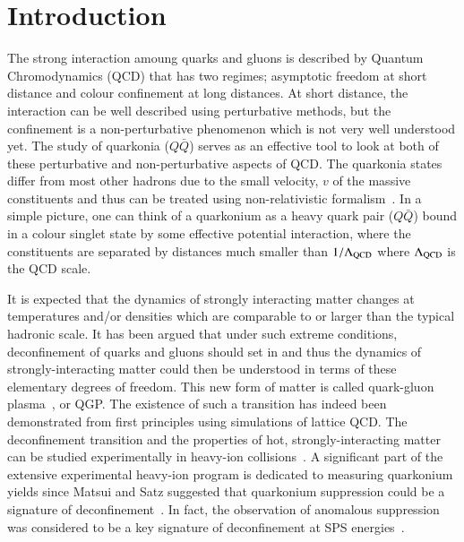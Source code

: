 \section{Introduction}
\label{sec:Introduction}


The strong interaction amoung quarks and gluons is described by
Quantum Chromodynamics (QCD) that has two regimes; asymptotic freedom at short distance
and colour confinement at long distances.
At short distance, the interaction can be well described using perturbative methods,
but the confinement is a non-perturbative phenomenon which is not very
well understood yet. 
 The study of quarkonia ($Q\bar{Q}$) serves as an effective 
tool to look at  both of these perturbative and non-perturbative aspects of QCD.
The quarkonia states differ from most other hadrons due to the small velocity, $v$ of the massive
constituents and thus can be treated using non-relativistic formalism~\cite{Povh:1995mua,Ikhdair:2005jf}. 
In a simple picture, one can think of a quarkonium as a heavy quark pair ($Q\bar{Q}$) bound
in a colour singlet state by some effective potential interaction, where the constituents are 
separated by distances much smaller than $1/\Lambda_{\rm QCD}$ where $\Lambda_{\rm QCD}$
is the QCD scale.


It is expected that the dynamics of strongly interacting matter changes
at temperatures and/or densities which are comparable to or larger than
the typical hadronic scale.
It has been argued that under such extreme conditions, 
deconfinement of quarks and gluons should set in and thus the 
dynamics of strongly-interacting matter could then
be understood in terms of these elementary degrees of freedom.
This new form of matter is called
quark-gluon plasma~\cite{Shuryak:1980tp,Satz:2011wf}, or QGP.
The existence of such a transition has indeed been demonstrated 
from first principles using simulations of lattice QCD.
 The deconfinement transition and the properties of hot, strongly-interacting 
matter can be studied experimentally in heavy-ion collisions~\cite{Satz:2000bn}. 
A significant part of the extensive experimental heavy-ion
program is dedicated to measuring quarkonium yields since Matsui and Satz
suggested that quarkonium suppression could be a signature of 
deconfinement~\cite{Matsui:1986dk}.
In fact, the observation of anomalous suppression was considered to be
a key signature of deconfinement at SPS energies~\cite{Kluberg:2005yh}.




